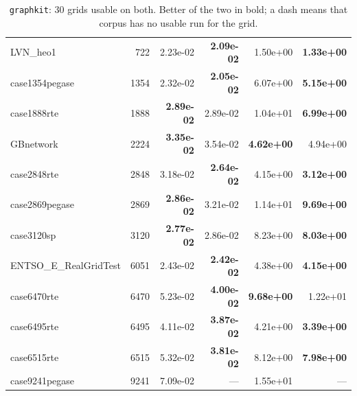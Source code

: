 \documentclass[10pt]{article}
\begin{document}
\begin{table}[H]
\begin{tabular}{lr rr rr}
LVN\_heo1 & 722 & 2.23e-02 & \textbf{2.09e-02} & 1.50e+00 & \textbf{1.33e+00} \\
case1354pegase & 1354 & 2.32e-02 & \textbf{2.05e-02} & 6.07e+00 & \textbf{5.15e+00} \\
case1888rte & 1888 & \textbf{2.89e-02} & 2.89e-02 & 1.04e+01 & \textbf{6.99e+00} \\
GBnetwork & 2224 & \textbf{3.35e-02} & 3.54e-02 & \textbf{4.62e+00} & 4.94e+00 \\
case2848rte & 2848 & 3.18e-02 & \textbf{2.64e-02} & 4.15e+00 & \textbf{3.12e+00} \\
case2869pegase & 2869 & \textbf{2.86e-02} & 3.21e-02 & 1.14e+01 & \textbf{9.69e+00} \\
case3120sp & 3120 & \textbf{2.77e-02} & 2.86e-02 & 8.23e+00 & \textbf{8.03e+00} \\
ENTSO\_E\_RealGridTest & 6051 & 2.43e-02 & \textbf{2.42e-02} & 4.38e+00 & \textbf{4.15e+00} \\
case6470rte & 6470 & 5.23e-02 & \textbf{4.00e-02} & \textbf{9.68e+00} & 1.22e+01 \\
case6495rte & 6495 & 4.11e-02 & \textbf{3.87e-02} & 4.21e+00 & \textbf{3.39e+00} \\
case6515rte & 6515 & 5.32e-02 & \textbf{3.81e-02} & 8.12e+00 & \textbf{7.98e+00} \\
case9241pegase & 9241 & 7.09e-02 & --- & 1.55e+01 & --- \\
\bottomrule
\end{tabular}
\caption{\texttt{graphkit}: 30 grids usable on both. Better of the two in bold; a dash means that corpus
has no usable run for the grid.}
\end{table}
\end{document}
